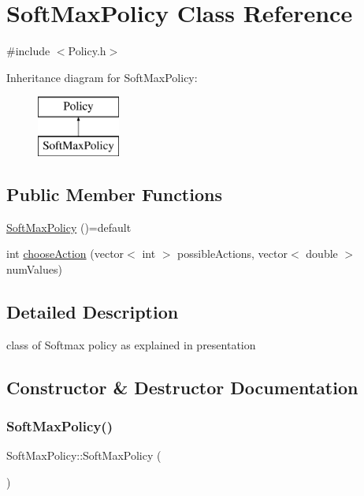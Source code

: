 \hypertarget{class_soft_max_policy}{}\section{Soft\+Max\+Policy Class Reference}
\label{class_soft_max_policy}


{\ttfamily \#include $<$Policy.\+h$>$}

Inheritance diagram for Soft\+Max\+Policy\+:\begin{figure}[H]
\begin{center}
\leavevmode
\includegraphics[height=2.000000cm]{class_soft_max_policy}
\end{center}
\end{figure}
\subsection*{Public Member Functions}
\begin{DoxyCompactItemize}
\item 
\mbox{\hyperlink{class_soft_max_policy_a9afd80b240005fc750fce1834265f80e}{Soft\+Max\+Policy}} ()=default
\item 
int \mbox{\hyperlink{class_soft_max_policy_a425d8bb5f2f504f2d7de8576f0e3f81f}{choose\+Action}} (vector$<$ int $>$ possible\+Actions, vector$<$ double $>$ num\+Values)
\end{DoxyCompactItemize}


\subsection{Detailed Description}
class of Softmax policy as explained in presentation 

\subsection{Constructor \& Destructor Documentation}
\mbox{\label{class_soft_max_policy_a9afd80b240005fc750fce1834265f80e}} 
\subsubsection{\texorpdfstring{Soft\+Max\+Policy()}{SoftMaxPolicy()}}
{\footnotesize\ttfamily Soft\+Max\+Policy\+::\+Soft\+Max\+Policy (\begin{DoxyParamCaption}{ }\end{DoxyParamCaption})\hspace{0.3cm}{\ttfamily [default]}}

